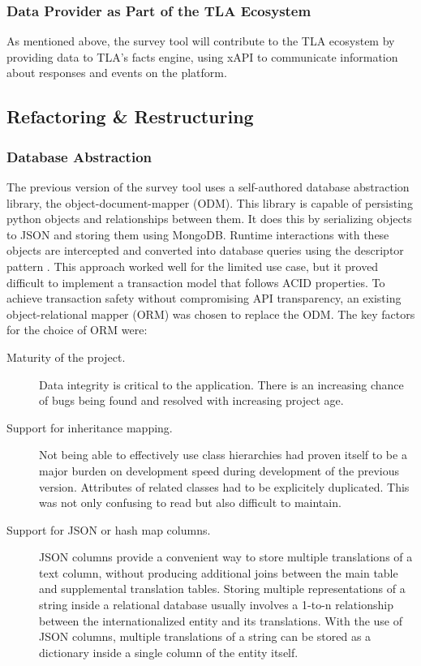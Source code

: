      \subsubsection{Data Provider as Part of the TLA Ecosystem}
     As mentioned above, the survey tool will contribute to the TLA ecosystem
     by providing data to TLA's facts engine, using xAPI to communicate
     information about responses and events on the platform.

\subsection{Refactoring \& Restructuring}
\subsubsection{Database Abstraction}
The previous version of the survey tool uses a self-authored database abstraction library,
the object-document-mapper (ODM). This library is capable of persisting python objects
and relationships between them. It does this by serializing objects to JSON and storing them
using MongoDB. Runtime interactions with these objects are intercepted and converted into 
database queries using the descriptor pattern \cite{python-descriptors}.
This approach worked well for the limited use case, but it proved difficult to implement
a transaction model that follows ACID properties.
To achieve transaction safety without compromising API transparency, an existing
object-relational mapper (ORM) was chosen to replace the ODM. The key factors for the choice
of ORM were:

\begin{description}
    \item[Maturity of the project.] Data integrity is critical to the application. There is an
    increasing chance of bugs being found and resolved with increasing project age.
    \item[Support for inheritance mapping.] Not being able to effectively use class hierarchies 
    had proven itself to be a major burden on development speed during development of the previous
    version. Attributes of related classes had to be explicitely duplicated. 
    This was not only confusing to read but also difficult to maintain. 
    \item[Support for JSON or hash map columns.] JSON columns provide a convenient way to store multiple 
    translations of a text column, without producing additional joins between the main table and
    supplemental translation tables. Storing multiple representations of a string
    inside a relational database usually involves a 1-to-n relationship between
    the internationalized entity and its translations. With the use of JSON columns,
    multiple translations of a string can be stored as a dictionary inside a single
    column of the entity itself.
\end{description}

